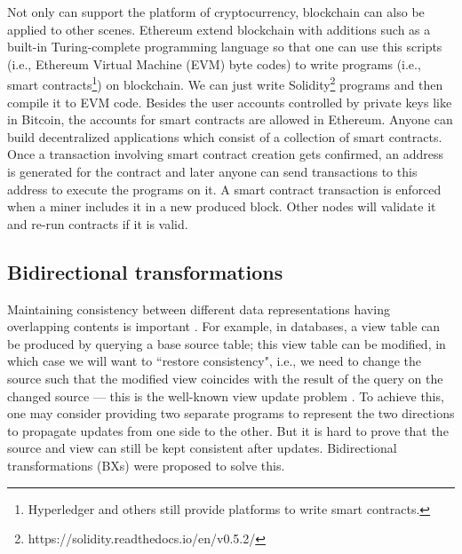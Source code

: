 \documentclass[conference]{IEEEtran}
\begin{document}
	Not only can support the platform of cryptocurrency, blockchain can also be applied to other scenes. Ethereum \cite{wood2014ethereum} extend blockchain with additions such as a built-in Turing-complete programming language so that one can use this scripts (i.e., Ethereum Virtual Machine (EVM) byte codes) to write programs (i.e., smart contracts\footnote{Hyperledger and others still provide platforms to write smart contracts.}) on blockchain. We can just write Solidity\footnote{https://solidity.readthedocs.io/en/v0.5.2/} programs and then compile it to EVM code. Besides the user accounts controlled by private keys like in Bitcoin, the accounts for smart contracts are allowed in Ethereum. Anyone can build decentralized applications which consist of a collection of smart contracts. Once a transaction involving smart contract creation gets confirmed, an address is generated for the contract and later anyone can send transactions to this address to execute the programs on it. A smart contract transaction is enforced when a miner includes it in a new produced block. Other nodes will validate it and re-run contracts if it is valid.
	
	\subsection{Bidirectional transformations}
	Maintaining consistency between different data representations having overlapping  contents is important \cite{abou2018introduction}. For example, in databases, a view table can be produced by querying a base source table; this view table can be modified, in which case we will want to ``restore consistency", i.e.,  we need to change the source such that the modified view coincides with the result of the query on the changed source --- this is the well-known view update problem \cite{bancilhon1981update}. To achieve this, one may consider providing two separate programs to represent the two directions to propagate updates from one side to the other. But it is hard to prove that the source and view can still be kept consistent after updates. Bidirectional transformations (BXs) were proposed  \cite{czarnecki2009bidirectional} to solve this.
	
\end{document}

